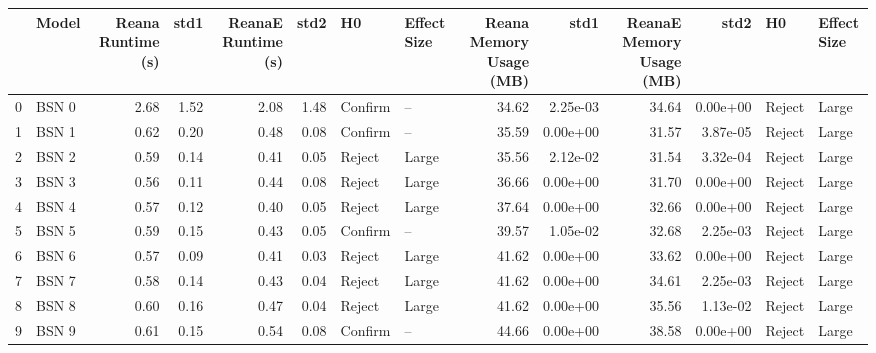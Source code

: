 \begin{tabular}{llrrrrllrrrrll}
\toprule
{} &   Model &  Reana Runtime (s) &   std1 &  ReanaE Runtime (s) &   std2 &       H0 & Effect Size &  Reana Memory Usage (MB) &      std1 &  ReanaE Memory Usage (MB) &      std2 &       H0 & Effect Size \\
\midrule
0  &   BSN 0 &               2.68 &   1.52 &                2.08 &   1.48 &  Confirm &          -- &                    34.62 &  2.25e-03 &                     34.64 &  0.00e+00 &   Reject &       Large \\
1  &   BSN 1 &               0.62 &   0.20 &                0.48 &   0.08 &  Confirm &          -- &                    35.59 &  0.00e+00 &                     31.57 &  3.87e-05 &   Reject &       Large \\
2  &   BSN 2 &               0.59 &   0.14 &                0.41 &   0.05 &   Reject &       Large &                    35.56 &  2.12e-02 &                     31.54 &  3.32e-04 &   Reject &       Large \\
3  &   BSN 3 &               0.56 &   0.11 &                0.44 &   0.08 &   Reject &       Large &                    36.66 &  0.00e+00 &                     31.70 &  0.00e+00 &   Reject &       Large \\
4  &   BSN 4 &               0.57 &   0.12 &                0.40 &   0.05 &   Reject &       Large &                    37.64 &  0.00e+00 &                     32.66 &  0.00e+00 &   Reject &       Large \\
5  &   BSN 5 &               0.59 &   0.15 &                0.43 &   0.05 &  Confirm &          -- &                    39.57 &  1.05e-02 &                     32.68 &  2.25e-03 &   Reject &       Large \\
6  &   BSN 6 &               0.57 &   0.09 &                0.41 &   0.03 &   Reject &       Large &                    41.62 &  0.00e+00 &                     33.62 &  0.00e+00 &   Reject &       Large \\
7  &   BSN 7 &               0.58 &   0.14 &                0.43 &   0.04 &   Reject &       Large &                    41.62 &  0.00e+00 &                     34.61 &  2.25e-03 &   Reject &       Large \\
8  &   BSN 8 &               0.60 &   0.16 &                0.47 &   0.04 &   Reject &       Large &                    41.62 &  0.00e+00 &                     35.56 &  1.13e-02 &   Reject &       Large \\
9  &   BSN 9 &               0.61 &   0.15 &                0.54 &   0.08 &  Confirm &          -- &                    44.66 &  0.00e+00 &                     38.58 &  0.00e+00 &   Reject &       Large \\

\end{tabular}
